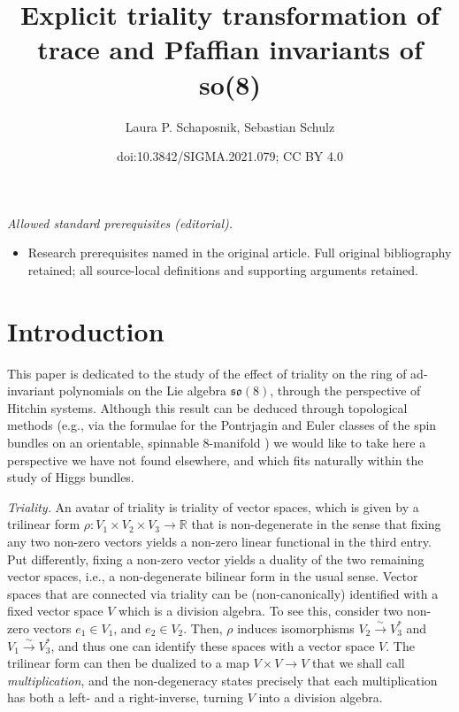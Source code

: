\documentclass[10pt,a4paper]{amsart}
\title{Explicit triality transformation of trace and Pfaffian invariants of so(8)}
\author{Laura P. Schaposnik, Sebastian Schulz}
\date{doi:10.3842/SIGMA.2021.079; CC BY 4.0}
\numberwithin{equation}{section}
\begin{document}
\maketitle
\noindent\textit{Allowed standard prerequisites (editorial).}\begin{itemize}
\item Research prerequisites named in the original article. Full original bibliography retained; all source-local definitions and supporting arguments retained.
\end{itemize}\medskip
\section{Introduction}

This paper is dedicated to the study of the effect of triality on the ring of ad-invariant polynomials on the Lie algebra $\mathfrak{so}(8)$, through the perspective of Hitchin systems. Although this result can be deduced through topological methods (e.g., via the formulae for the Pontrjagin and Euler classes of the spin bundles on an orientable, spinnable 8-manifold \cite{lawson2016spin}) we would like to take here a perspective we have not found elsewhere, and which fits naturally within the study of Higgs bundles.

{\it Triality.} An avatar of triality is triality of vector spaces, which is given by a trilinear form
$\rho\colon V_{1}\times V_{2}\times V_{3}\to \mathbb{R}$ that is non-degenerate in the sense that fixing any two non-zero vectors yields a non-zero linear functional in the third entry. Put differently, fixing a non-zero vector yields a duality of the two remaining vector spaces, i.e., a non-degenerate bilinear form in the usual sense. Vector spaces that are connected via triality can be (non-canonically) identified with a fixed vector space $V$ which is a division algebra. To see this, consider two non-zero vectors $e_1 \in V_1$, and $e_2 \in V_2$. Then, $\rho$ induces isomorphisms $V_2 \xrightarrow{\sim} V_3^\ast$ and $V_1 \xrightarrow{\sim} V_3^\ast$, and thus one can identify these spaces with a vector space $V$. The trilinear form can then be dualized to a map $V \times V \to V$ that we shall call \textit{multiplication}, and the non-degeneracy states precisely that each multiplication has both a left- and a right-inverse, turning $V$ into a division algebra.
\end{document}
